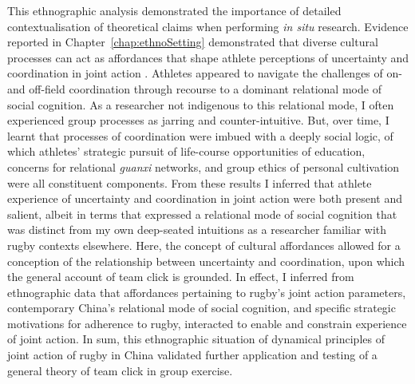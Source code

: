 This ethnographic analysis demonstrated the importance of detailed contextualisation of theoretical claims when performing \textit{in situ} research.  Evidence reported in Chapter~\ref{chap:ethnoSetting} demonstrated that diverse cultural processes can act as affordances that shape athlete perceptions of uncertainty and coordination in joint action \citep{Ramstead2016}.  Athletes appeared to navigate the challenges of on- and off-field coordination through recourse to a dominant relational mode of social cognition.  As a researcher not indigenous to this relational mode, I often experienced group processes as jarring and counter-intuitive.  But, over time, I learnt that processes of coordination were imbued with a deeply social logic, of which athletes' strategic pursuit of life-course opportunities of education, concerns for relational \textit{guanxi} networks, and group ethics of personal cultivation were all constituent components.  From these results I inferred that athlete experience of uncertainty and coordination in joint action were both present and salient, albeit in terms that expressed a relational mode of social cognition that was distinct from my own deep-seated intuitions as a researcher familiar with rugby contexts elsewhere. Here, the concept of cultural affordances \citep{Ramstead2016} allowed for a conception of the relationship between uncertainty and coordination, upon which the general account of team click is grounded.  In effect, I inferred from ethnographic data that affordances pertaining to rugby's joint action parameters, contemporary China's relational mode of social cognition, and specific strategic motivations for adherence to rugby, interacted to enable and constrain experience of joint action. In sum, this ethnographic situation of dynamical principles of joint action of rugby in China validated further application and testing of a general theory of team click in group exercise.


